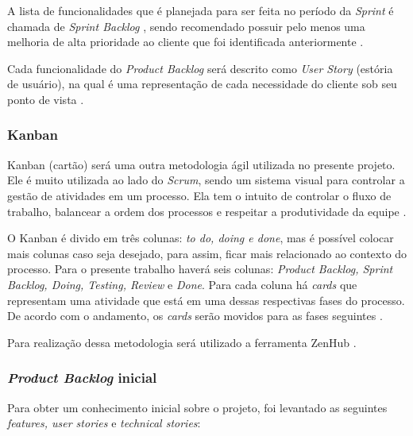A lista de funcionalidades que é planejada para ser feita no período da \textit{Sprint} é chamada de \textit{Sprint Backlog} , sendo recomendado possuir pelo menos uma melhoria de alta prioridade ao cliente que foi identificada anteriormente \cite{ijcf94}.

Cada funcionalidade do \textit{Product Backlog} será descrito como \textit{User Story} (estória de usuário), na qual é uma representação de cada necessidade do cliente sob seu ponto de vista \cite{knowledge21:2019}.

\subsubsection{Kanban}

Kanban (cartão) será uma outra metodologia ágil utilizada no presente projeto. Ele é muito utilizada ao lado do \textit{Scrum}, sendo um sistema visual para controlar a gestão de atividades em um processo. Ela tem o intuito de controlar o fluxo de trabalho, balancear a ordem dos processos e respeitar a produtividade da equipe \cite{ARTIA:2019}.

O Kanban é divido em três colunas: \textit{to do, doing e done}, mas é possível colocar mais colunas caso seja desejado, para assim, ficar mais relacionado ao contexto do processo. Para o presente trabalho haverá seis colunas: \textit{Product Backlog, Sprint Backlog, Doing, Testing, Review} e \textit{Done}. Para cada coluna há \textit{cards} que representam uma atividade que está em uma dessas respectivas fases do processo. De acordo com o andamento, os \textit{cards} serão movidos para as fases seguintes \cite{ARTIA:2019}.

Para realização dessa metodologia será utilizado a ferramenta ZenHub \cite{zenhub:2019}.

\subsubsection{\textit{Product Backlog} inicial}

Para obter um conhecimento inicial sobre o projeto, foi levantado as seguintes \textit{features, user stories} e \textit{technical stories}:

